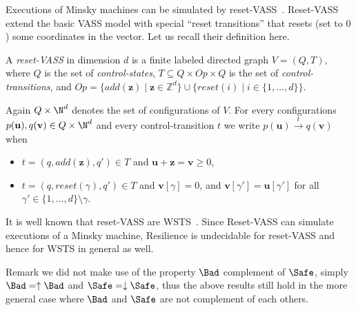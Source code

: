 Executions of Minsky machines can be simulated by reset-VASS~\cite{araki1976PN}. 
Reset-VASS extend the basic VASS model with special “reset
transitions” that resets (set to $0$) some coordinates in the vector. Let us recall their definition here.
\begin{definition}
A {\em reset-VASS} in dimension $d$ %
 is a finite 
labeled directed graph $V = (Q,T)$, where $Q$ is the set of {\em control-states}, 
$T \subseteq Q \times Op \times Q$
is the set of {\em control-transitions}, and $Op = \{ add(\textbf{z}) \mid \textbf{z} \in \mathds{Z}^d\} \cup 
		\{ reset(i) \mid i \in \{1,\ldots,d\} \}$.
\end{definition}

Again $Q \times \N^d$
 denotes the set of configurations of $V$.
For every configurations $p(\textbf{u}), q(\textbf{v}) \in Q \times \N^d$ and every control-transition $t$ we write
$p(\textbf{u}) \xrightarrow{t} q(\textbf{v})$ when 
\begin{samepage}\begin{itemize}
\item  $t = (q,add(\textbf{z}),q') \in T$
and $\textbf{u}+\textbf{z} = \textbf{v} \geq 0$,
\item $t = (q,reset(\gamma),q') \in T$ 
and
$\textbf{v}[\gamma] = 0$, and $\textbf{v}[\gamma'] = \textbf{u}[\gamma']$ for all $\gamma' \in \{1,\ldots, d\} \setminus \gamma$.
\end{itemize} \end{samepage}

It is well known that reset-VASS are WSTS~\cite{dufourd1998reset}. 
Since Reset-VASS can simulate executions of a Minsky machine, {\sc Resilience} is undecidable for reset-VASS and hence for WSTS in general as well.





Remark we did not make use of the
property $\Bad$ complement of $\Safe$, simply 
$\Bad=\uparrow \Bad$ and $\Safe=\downarrow \Safe$, thus 
the above results still hold in the more general case where $\Bad$ and $\Safe$ are not complement of each others.






